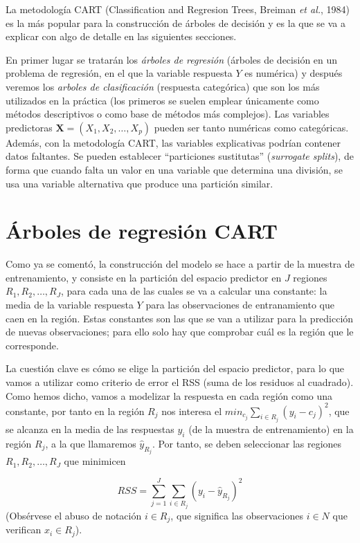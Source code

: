\documentclass[]{book}
\theoremstyle{break}
\theoremstyle{definition}
\theoremstyle{definition}
\theoremstyle{definition}
\theoremstyle{remark}
\begin{document}
La metodología CART (Classification and Regresion Trees, Breiman
\emph{et al.}, 1984) es la más popular para la construcción de árboles
de decisión y es la que se va a explicar con algo de detalle en las
siguientes secciones.

En primer lugar se tratarán los \emph{árboles de regresión} (árboles de
decisión en un problema de regresión, en el que la variable respuesta
\(Y\) es numérica) y después veremos los \emph{arboles de clasificación}
(respuesta categórica) que son los más utilizados en la práctica (los
primeros se suelen emplear únicamente como métodos descriptivos o como
base de métodos más complejos). Las variables predictoras
\(\mathbf{X}=(X_1, X_2, \ldots, X_p)\) pueden ser tanto numéricas como
categóricas. Además, con la metodología CART, las variables explicativas
podrían contener datos faltantes. Se pueden establecer ``particiones
sustitutas'' (\emph{surrogate splits}), de forma que cuando falta un
valor en una variable que determina una división, se usa una variable
alternativa que produce una partición similar.

\section{Árboles de regresión
CART}\label{uxe1rboles-de-regresiuxf3n-cart}

Como ya se comentó, la construcción del modelo se hace a partir de la
muestra de entrenamiento, y consiste en la partición del espacio
predictor en \(J\) regiones \(R_1, R_2, \ldots, R_J\), para cada una de
las cuales se va a calcular una constante: la media de la variable
respuesta \(Y\) para las observaciones de entranamiento que caen en la
región. Estas constantes son las que se van a utilizar para la
predicción de nuevas observaciones; para ello solo hay que comprobar
cuál es la región que le corresponde.

La cuestión clave es cómo se elige la partición del espacio predictor,
para lo que vamos a utilizar como criterio de error el RSS (suma de los
residuos al cuadrado). Como hemos dicho, vamos a modelizar la respuesta
en cada región como una constante, por tanto en la región \(R_j\) nos
interesa el \(min_{c_j} \sum_{i\in R_j} (y_i - c_j)^2\), que se alcanza
en la media de las respuestas \(y_i\) (de la muestra de entrenamiento)
en la región \(R_j\), a la que llamaremos \(\widehat y_{R_j}\). Por
tanto, se deben seleccionar las regiones \(R_1, R_2, \ldots, R_J\) que
minimicen

\[RSS = \sum_{j=1}^{J} \sum_{i\in R_j} (y_i - \widehat y_{R_j})^2\]
(Obsérvese el abuso de notación \(i\in R_j\), que significa las
observaciones \(i\in N\) que verifican \(x_i \in R_j\)).
\end{document}

